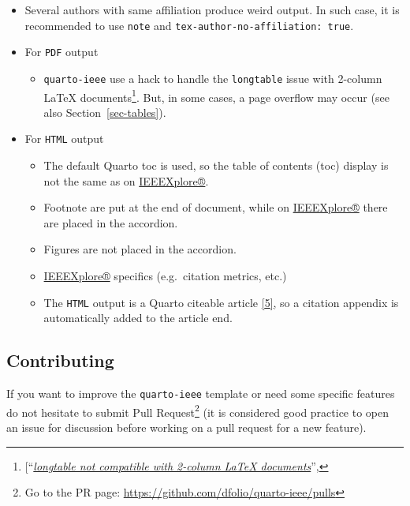 \documentclass[
  journal,
]{IEEEtran}%
\providecommand{\tightlist}{%
  \setlength{\itemsep}{0pt}\setlength{\parskip}{0pt}}\usepackage{longtable,booktabs,array}
\theoremstyle{plain}
\theoremstyle{remark}
\begin{document}
\begin{itemize}
\tightlist
\item
  Several authors with same affiliation produce weird output. In such
  case, it is recommended to use \texttt{note} and
  \texttt{tex-author-no-affiliation:\ true}.
\item
  For \texttt{PDF} output

  \begin{itemize}
  \tightlist
  \item
    \texttt{quarto-ieee} use a hack to handle the \texttt{longtable}
    issue with 2-column {\LaTeX} documents\footnote{{[}``\emph{\href{https://github.com/jgm/pandoc/issues/1023\%3E}{longtable
      not compatible with 2-column LaTeX documents}}'',}. But, in some
    cases, a page overflow may occur (see also
    Section~\ref{sec-tables}).
  \end{itemize}
\item
  For \texttt{HTML} output

  \begin{itemize}
  \tightlist
  \item
    The default Quarto toc is used, so the table of contents (toc)
    display is not the same as on
    \href{https://ieeexplore.ieee.org/}{IEEEXplore®}.
  \item
    Footnote are put at the end of document, while on
    \href{https://ieeexplore.ieee.org/}{IEEEXplore®} there are placed in
    the accordion.
  \item
    Figures are not placed in the accordion.
  \item
    \href{https://ieeexplore.ieee.org/}{IEEEXplore®} specifics
    (e.g.~citation metrics, etc.)
  \item
    The \texttt{HTML} output is a Quarto citeable article
    \protect\hyperlink{ref-quarto-citation}{{[}5{]}}, so a citation
    appendix is automatically added to the article end.
  \end{itemize}
\end{itemize}

\hypertarget{contributing}{%
\subsection{Contributing}\label{contributing}}

If you want to improve the \texttt{quarto-ieee} template or need some
specific features do not hesitate to submit Pull Request\footnote{Go to
  the PR page: \url{https://github.com/dfolio/quarto-ieee/pulls}} (it is
considered good practice to open an issue for discussion before working
on a pull request for a new feature).
\end{document}
